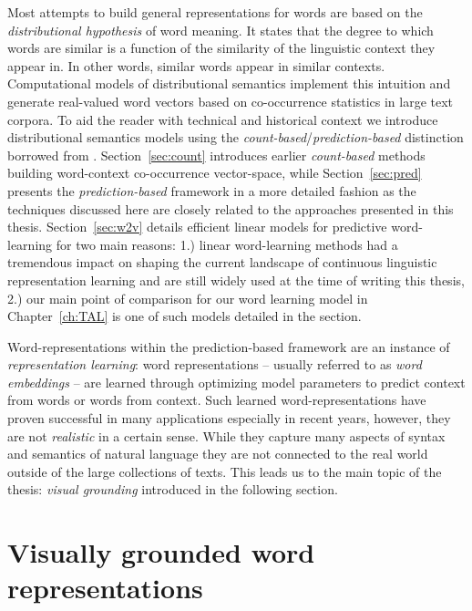 Most attempts to build  general representations for words are based on the
\emph{distributional hypothesis} of word meaning. It states that the degree to which words are similar
is a function of the similarity of the linguistic context they appear in. In other words, similar
words appear in similar contexts. Computational models of distributional
semantics implement this intuition and generate real-valued word vectors based on co-occurrence
statistics in large text corpora. 
To aid the reader with technical and historical context we introduce distributional
semantics models using the \emph{count-based}/\emph{prediction-based} distinction
borrowed from \cite{baroni2014don}.
Section~\ref{sec:count} introduces earlier \emph{count-based}
methods building word-context co-occurrence vector-space, while
Section~\ref{sec:pred} presents the  \emph{prediction-based} framework in a more
detailed fashion as the techniques discussed here are closely related
to the approaches presented in this thesis.
Section~\ref{sec:w2v} details efficient linear
models for predictive word-learning for two main reasons: 1.) linear word-learning methods
had a tremendous impact
on shaping the current landscape of continuous linguistic representation learning and are still
widely used at the time of writing this thesis, 2.) our main point of comparison for
our word learning model in Chapter~\ref{ch:TAL} is one of such models detailed in the section.

Word-representations within the prediction-based framework 
are an instance of \emph{representation learning}:
word representations -- usually referred to as \emph{word embeddings} -- are learned through
optimizing model parameters to predict context from words or words from context.
Such learned word-representations have proven successful in many applications especially
in recent years, however, they are not \emph{realistic} in a certain sense.
While they capture many aspects of syntax and semantics of natural language they 
are not connected to the real world outside of the large collections of texts.
This leads us to the main topic of the thesis:  \emph{visual grounding} introduced in the
following section.

\section{Visually grounded word representations}


